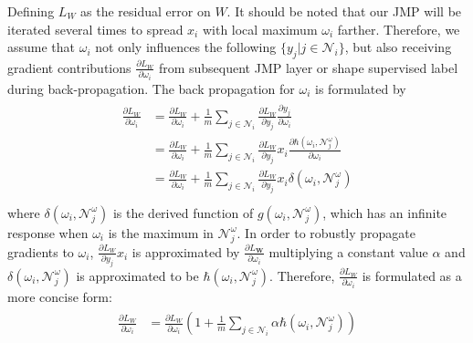 
Defining $L_{W}$ as the residual error on $W$.
It should be noted that our JMP will be iterated several times to spread $x_{i}$ with local maximum $\omega_{i}$ farther.
Therefore, we assume that $\omega_{i}$ not only influences the following $\{y_{j}|j\in\mathcal{N}_{i}\}$, but also receiving gradient contributions $\frac{\partial L_W}{\partial \omega_{i}}$ from subsequent JMP layer or shape supervised label during back-propagation.
The back propagation for $\omega_{i}$ is formulated by
%
\begin{eqnarray}\label{bps}
\begin{aligned}
\frac{\partial L_{W}}{\partial \omega_{i}}&=\frac{\partial L_{W}}{\partial \omega_{i}}+\frac{1}{m}\sum_{j\in\mathcal{N}_{i}}\frac{\partial L_{W}}{\partial y_{j}}\frac{\partial y_{j}}{\partial \omega_{i}}\\
&=\frac{\partial L_{W}}{\partial \omega_{i}}+\frac{1}{m}\sum_{j\in\mathcal{N}_{i}}\frac{\partial L_{W}}{\partial y_{j}}x_{i}\frac{\partial \hbar(\omega_{i},\mathcal{N}^{\omega}_{j})}{\partial \omega_{i}}\\
&=\frac{\partial L_{W}}{\partial \omega_{i}}+\frac{1}{m}\sum_{j\in\mathcal{N}_{i}}\frac{\partial L_{W}}{\partial y_{j}}x_{i}\delta(\omega_{i},\mathcal{N}^{\omega}_{j})\\
\end{aligned}
\end{eqnarray}
where $\delta(\omega_{i},\mathcal{N}^{\omega}_{j})$ is the derived function of $g(\omega_{i},\mathcal{N}^{\omega}_{j})$, which has an infinite response when $\omega_{i}$ is the maximum in $\mathcal{N}^{\omega}_{j}$.
In order to robustly propagate gradients to $\omega_{i}$, $\frac{\partial L_{W}}{\partial y_{j}}x_{i}$ is approximated by $\frac{\partial L_\mathbf{W}}{\partial \omega_{i}}$ multiplying a constant value $\alpha$  and $\delta(\omega_{i},\mathcal{N}^{\omega}_{j})$ is approximated to be $\hbar(\omega_{i},\mathcal{N}^{\omega}_{j})$.
Therefore, $\frac{\partial L_{W}}{\partial \omega_{i}}$ is formulated as a more concise form:
\begin{eqnarray}\label{dG}
\begin{aligned}
\frac{\partial L_{W}}{\partial \omega_{i}}&=\frac{\partial L_{W}}{\partial \omega_{i}}(1+\frac{1}{m}\sum_{j\in\mathcal{N}_{i}}\alpha \hbar(\omega_{i},\mathcal{N}^{\omega}_{j}))\\
\end{aligned}
\end{eqnarray}

